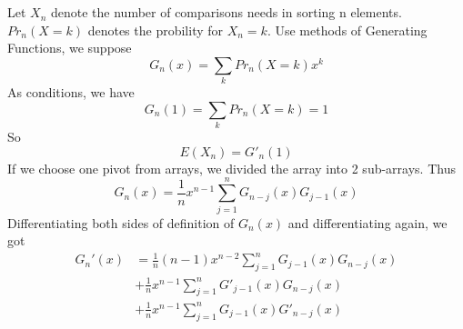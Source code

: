 \documentclass{article}
\begin{document}
	\section{}
	Let $X_n$ denote the number of comparisons needs in sorting n elements. $Pr_n(X=k)$ denotes the probility for $X_n=k$.
	Use methods of Generating Functions, we suppose
	$$G_n(x)=\sum_{k}{Pr_n(X=k)x^k}$$
	As conditions, we have
	$$G_n(1)=\sum_{k}{Pr_n(X=k)}=1$$
	So
	$$E(X_n)=G'_n(1)$$
	If we choose one pivot from arrays, we divided the array into 2 sub-arrays. Thus
	$$G_n(x)=\frac{1}{n}x^{n-1}\sum_{j=1}^{n}G_{n-j}(x)G_{j-1}(x)$$
	Differentiating both sides of definition of $G_n(x)$ and differentiating again, we got
	\begin{equation}
	\begin{aligned}
		G_n'(x)&=\frac{1}{n}(n-1)x^{n-2}\sum_{j=1}^{n}G_{j-1}(x)G_{n-j}(x)\\
			&+\frac{1}{n}x^{n-1}\sum_{j=1}^{n}G'_{j-1}(x)G_{n-j}(x)\\
			&+\frac{1}{n}x^{n-1}\sum_{j=1}^{n}G_{j-1}(x)G'_{n-j}(x)\\
	\end{aligned}
	\end{equation}
\end{document}
